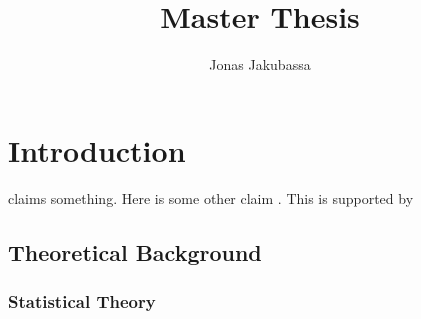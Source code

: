 \documentclass{book}
\title{Master Thesis}
\author{Jonas Jakubassa}
\begin{document}
    \maketitle

    \tableofcontents
    \listoffigures



    \chapter{Introduction}

    \cite[p. ~275]{esser2023} claims something. Here is some other claim \cite{helbing1995,lu2022}. This is supported by \cite{chen2019a}

    \section{Theoretical Background}
    \subsection{Statistical Theory}
\end{document}
